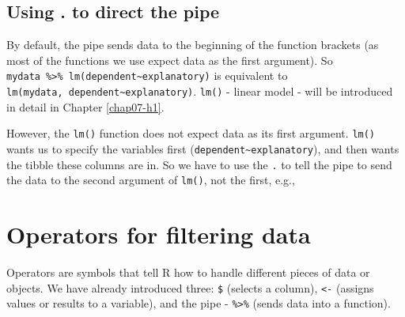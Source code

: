 \documentclass[
  12pt,
  krantz2]{krantz}
\makeatletter
\newenvironment{Shaded}{\begin{snugshade}}{\end{snugshade}}
\newcommand{\DataTypeTok}[1]{\textcolor[rgb]{0.13,0.29,0.53}{#1}}
\newcommand{\KeywordTok}[1]{\textcolor[rgb]{0.13,0.29,0.53}{\textbf{#1}}}
\newcommand{\NormalTok}[1]{#1}
\newcommand{\OperatorTok}[1]{\textcolor[rgb]{0.81,0.36,0.00}{\textbf{#1}}}
\newcommand{\StringTok}[1]{\textcolor[rgb]{0.31,0.60,0.02}{#1}}
\newenvironment{kframe}{%
\medskip{}
\setlength{\fboxsep}{.8em}
 \def\at@end@of@kframe{}%
 \ifinner\ifhmode%
  \def\at@end@of@kframe{\end{minipage}}%
  \begin{minipage}{\columnwidth}%
 \fi\fi%
 \def\FrameCommand##1{\hskip\@totalleftmargin \hskip-\fboxsep
 \colorbox{shadecolor}{##1}\hskip-\fboxsep
     \hskip-\linewidth \hskip-\@totalleftmargin \hskip\columnwidth}%
 \MakeFramed {\advance\hsize-\width
   \@totalleftmargin\z@ \linewidth\hsize
   \@setminipage}}%
 {\par\unskip\endMakeFramed%
 \at@end@of@kframe}
\renewenvironment{Shaded}{\begin{kframe}}{\end{kframe}}
\makeatother
\begin{document}
\hypertarget{using-.-to-direct-the-pipe}{%
\subsection{Using . to direct the pipe}\label{using-.-to-direct-the-pipe}}

By default, the pipe sends data to the beginning of the function brackets (as most of the functions we use expect data as the first argument).
So \texttt{mydata\ \%\textgreater{}\%\ lm(dependent\textasciitilde{}explanatory)} is equivalent to \texttt{lm(mydata,\ dependent\textasciitilde{}explanatory)}.
\texttt{lm()} - linear model - will be introduced in detail in Chapter \ref{chap07-h1}.

However, the \texttt{lm()} function does not expect data as its first argument.
\texttt{lm()} wants us to specify the variables first (\texttt{dependent\textasciitilde{}explanatory}), and then wants the tibble these columns are in.
So we have to use the \texttt{.} to tell the pipe to send the data to the second argument of \texttt{lm()}, not the first, e.g.,

\begin{Shaded}
\end{Shaded}

\hypertarget{operators-for-filtering-data}{%
\section{Operators for filtering data}\label{operators-for-filtering-data}}


Operators are symbols that tell R how to handle different pieces of data or objects.
We have already introduced three: \texttt{\$} (selects a column), \texttt{\textless{}-} (assigns values or results to a variable), and the pipe - \texttt{\%\textgreater{}\%} (sends data into a function).
\end{document}
